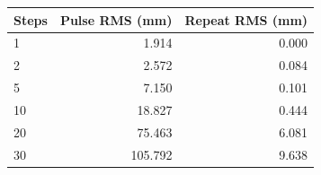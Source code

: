 \begin{tabular}{lrr}
\toprule
Steps & Pulse RMS (mm) & Repeat RMS (mm)\\
\midrule
1 & 1.914 & 0.000\\
2 & 2.572 & 0.084\\
5 & 7.150 & 0.101\\
10 & 18.827 & 0.444\\
20 & 75.463 & 6.081\\
30 & 105.792 & 9.638\\
\bottomrule
\end{tabular}
